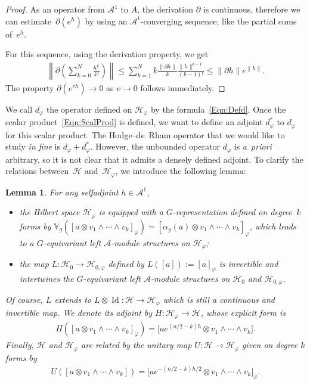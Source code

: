 \documentclass[11pt]{article}
\newtheorem{Lemma}[Theorem]{Lemma}
\newcommand{\Aa}{\mathcal{A}}
\newcommand{\Hh}{\mathscr{H}}
\newcommand{\RepV}{\mathbb{V}}
\DeclareMathOperator{\id}{Id}
\numberwithin{equation}{section}
\begin{document}
\begin{proof}
As an operator from $\Aa^1$ to $A$, the derivation $\partial $ is continuous, therefore we can estimate~$\partial (e^h)$ by using an $\Aa^1$-converging sequence, like the partial sums of~$e^{h}$.

For this sequence, using the derivation property, we get
\begin{gather*}
\left\| \partial \left( \sum_{k=0}^N \frac{h^k}{k !} \right) \right\| \leqslant \sum_{k=1}^N k \frac{\| \partial h \| }{k} \frac{\| h \|^{k-1}}{(k-1)!} \leqslant \| \partial h \| e^{\| h \|}.
\end{gather*}
The property $\partial (e^{v h}) \to 0$ as $v \to 0$ follows immediately.
\end{proof}

We call $d_\varphi$ the operator def\/ined on $\Hh_\varphi$ by the formula~\eqref{Eqn:Defd}. Once the scalar product~\eqref{Eqn:ScalProd} is def\/ined, we want to def\/ine an adjoint $d^*_\varphi$ to $d_\varphi$ for this scalar product. The Hodge--de~Rham operator that we would like to study \textit{in fine} is $d_\varphi + d_\varphi^*$. However, the unbounded operator $d_\varphi$ is \textit{a~priori} arbitrary, so it is not clear that it admits a densely def\/ined adjoint. To clarify the relations between~$\Hh$ and~$\Hh_\varphi$, we introduce the following lemma:
\begin{Lemma}
\label{Lem:EquivRep}
For any selfadjoint $h \in \Aa^1$,
\begin{itemize}\itemsep=0pt
\item
the Hilbert space $\Hh_{\varphi}$ is equipped with a $G$-representation defined on degree~$k$ forms by $\RepV_g( [a \otimes v_1 \wedge \cdots \wedge v_k]_\varphi) = [\alpha_g(a) \otimes v_1 \wedge \cdots \wedge v_k]_\varphi$, which leads to a $G$-equivariant left $\Aa$-module structures on $\Hh_{\varphi}$;
\item
the map $L \colon \Hh_0 \to \Hh_{0,\varphi}$ defined by $L([a]):= [a]_\varphi$ is invertible and intertwines the $G$-equivariant left $\Aa$-module structures on $\Hh_0$ and $\Hh_{0,\varphi}$.
\end{itemize}
Of course, $L$ extends to $L \otimes \id \colon \Hh \to \Hh_\varphi$ which is still a continuous and invertible map. We denote its adjoint by $H \colon \Hh_\varphi \to \Hh$, whose explicit form is
\begin{gather*}
H( [a \otimes v_1 \wedge \cdots \wedge v_k]_\varphi ) =\big [a e^{(n/2-k)h} \otimes v_1 \wedge \cdots \wedge v_k\big].
\end{gather*}
Finally, $\Hh$ and $\Hh_\varphi$ are related by the unitary map $U \colon \Hh \to \Hh_\varphi$ given on degree $k$ forms by
\begin{gather*}
U( [a \otimes v_1 \wedge \cdots \wedge v_k] ) = \big[a e^{-(n/2-k)h/2} \otimes v_1 \wedge \cdots \wedge v_k\big]_\varphi.
\end{gather*}
\end{Lemma}
\end{document}
